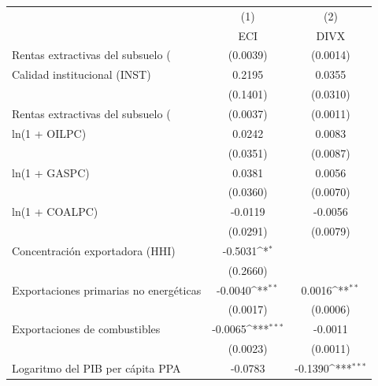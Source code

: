 {
\def\sym#1{\ifmmode^{#1}\else\(^{#1}\)\fi}
\begin{tabular}{l*{2}{c}}
\toprule
                    &\multicolumn{1}{c}{(1)}&\multicolumn{1}{c}{(2)}\\
                    &\multicolumn{1}{c}{ECI}&\multicolumn{1}{c}{DIVX}\\
\midrule
Rentas extractivas del subsuelo (%
                    &    (0.0039)         &    (0.0014)         \\
\addlinespace
Calidad institucional (INST)&      0.2195         &      0.0355         \\
                    &    (0.1401)         &    (0.0310)         \\
\addlinespace
Rentas extractivas del subsuelo (%
                    &    (0.0037)         &    (0.0011)         \\
\addlinespace
ln(1 + OILPC)       &      0.0242         &      0.0083         \\
                    &    (0.0351)         &    (0.0087)         \\
\addlinespace
ln(1 + GASPC)       &      0.0381         &      0.0056         \\
                    &    (0.0360)         &    (0.0070)         \\
\addlinespace
ln(1 + COALPC)      &     -0.0119         &     -0.0056         \\
                    &    (0.0291)         &    (0.0079)         \\
\addlinespace
Concentración exportadora (HHI)&     -0.5031\sym{*}  &                     \\
                    &    (0.2660)         &                     \\
\addlinespace
Exportaciones primarias no energéticas&     -0.0040\sym{**} &      0.0016\sym{**} \\
                    &    (0.0017)         &    (0.0006)         \\
\addlinespace
Exportaciones de combustibles&     -0.0065\sym{***}&     -0.0011         \\
                    &    (0.0023)         &    (0.0011)         \\
\addlinespace
Logaritmo del PIB per cápita PPA&     -0.0783         &     -0.1390\sym{***}\\

\end{tabular}}
